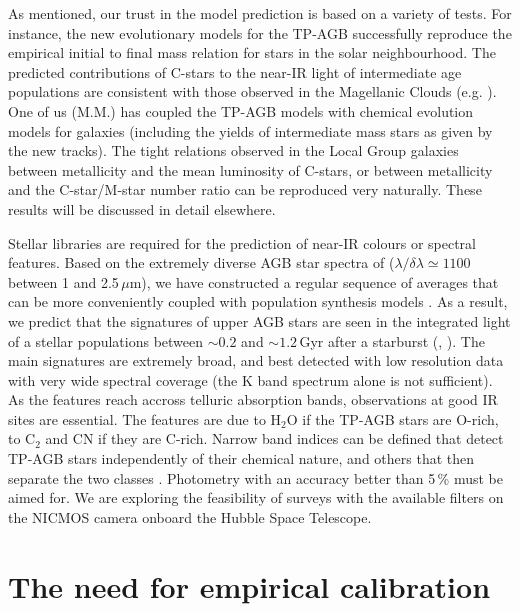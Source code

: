 \documentclass[runningheads]{svmult}
\begin{document}
As mentioned, our trust in the model prediction is based on a variety of tests.
For instance, the new evolutionary models for the TP-AGB successfully 
reproduce the empirical initial to final mass relation for stars in the 
solar neighbourhood. The predicted contributions of C-stars to the
near-IR light of intermediate age populations are consistent with
those observed in the Magellanic Clouds (e.g. \cite{PACFM83}).
One of us (M.M.) has coupled the TP-AGB models with 
chemical evolution models for galaxies (including the yields of 
intermediate mass stars as given by the new tracks). The tight relations 
observed in the Local Group galaxies between metallicity and the mean 
luminosity of C-stars, or between metallicity and the C-star/M-star number 
ratio can be reproduced very naturally. These results will be discussed
in detail elsewhere. 

Stellar libraries are required for the prediction of near-IR colours
or spectral features. Based on the extremely diverse AGB star spectra of 
\cite{LW00} 
($\lambda/\delta \lambda \simeq 1100$ between 1 and 2.5\,$\mu$m), 
we have constructed a regular sequence
of averages that can be more conveniently coupled with population
synthesis models \cite{LM01}. As a result, we predict that the signatures
of upper AGB stars are seen in the integrated light of a stellar populations
between $\sim 0.2$ and $\sim 1.2$\,Gyr after a starburst (\cite{ML01},
\cite{LMFS99}). The main signatures are extremely broad, and
best detected with low resolution data with very wide spectral coverage
(the K band spectrum alone is not sufficient). As the features reach accross
telluric absorption bands, observations at good IR sites are essential.
The features are due to H$_2$O if the TP-AGB stars are O-rich, to C$_2$ and
CN if they are C-rich. Narrow band indices can be defined that
detect TP-AGB stars independently of their chemical nature,
and others that then separate the two classes \cite{LMFS99}. Photometry
with an accuracy better than 5\,\% must be aimed for. We are 
exploring the feasibility of surveys with the available filters on
the NICMOS camera onboard the Hubble Space Telescope.

\section{The need for empirical calibration}
\end{document}
